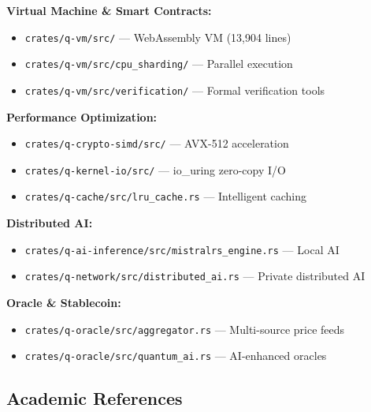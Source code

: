 \documentclass[11pt,a4paper]{scrartcl}
\begin{document}
\textbf{Virtual Machine \& Smart Contracts:}
\begin{itemize}
\item \texttt{crates/q-vm/src/} — WebAssembly VM (13,904 lines)
\item \texttt{crates/q-vm/src/cpu\_sharding/} — Parallel execution
\item \texttt{crates/q-vm/src/verification/} — Formal verification tools
\end{itemize}

\textbf{Performance Optimization:}
\begin{itemize}
\item \texttt{crates/q-crypto-simd/src/} — AVX-512 acceleration
\item \texttt{crates/q-kernel-io/src/} — io\_uring zero-copy I/O
\item \texttt{crates/q-cache/src/lru\_cache.rs} — Intelligent caching
\end{itemize}

\textbf{Distributed AI:}
\begin{itemize}
\item \texttt{crates/q-ai-inference/src/mistralrs\_engine.rs} — Local AI
\item \texttt{crates/q-network/src/distributed\_ai.rs} — Private distributed AI
\end{itemize}

\textbf{Oracle \& Stablecoin:}
\begin{itemize}
\item \texttt{crates/q-oracle/src/aggregator.rs} — Multi-source price feeds
\item \texttt{crates/q-oracle/src/quantum\_ai.rs} — AI-enhanced oracles
\end{itemize}

\subsection*{Academic References}
\end{document}
